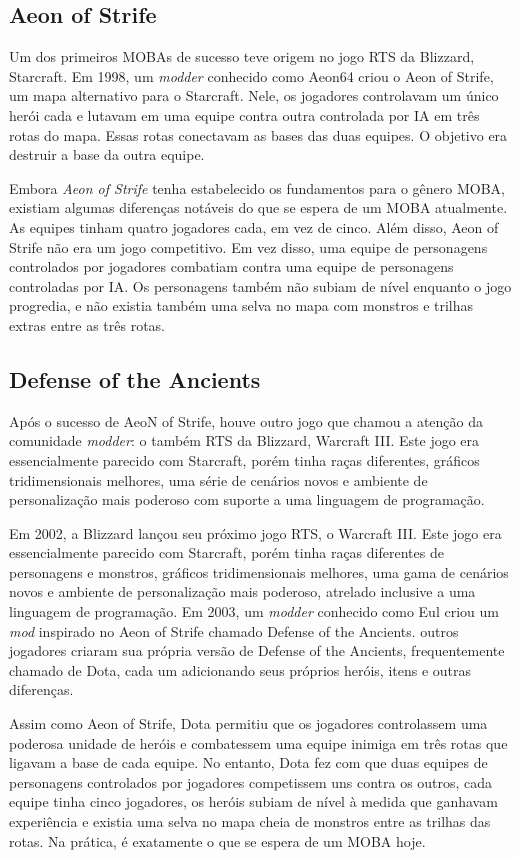 \subsection{Aeon of Strife}
Um dos primeiros MOBAs de sucesso teve origem no jogo RTS da Blizzard, Starcraft. Em 1998, um \textit{modder} conhecido como Aeon64 criou o Aeon of Strife, um mapa alternativo para o Starcraft. Nele, os jogadores controlavam um único herói cada e lutavam em uma equipe contra outra controlada por IA em três rotas do mapa. Essas rotas conectavam as bases das duas equipes. O objetivo era destruir a base da outra equipe.

Embora \textit{Aeon of Strife} tenha estabelecido os fundamentos para o gênero MOBA, existiam algumas diferenças notáveis do que se espera de um MOBA atualmente. As equipes tinham quatro jogadores cada, em vez de cinco. Além disso, Aeon of Strife não era um jogo competitivo. Em vez disso, uma equipe de personagens controlados por jogadores combatiam contra uma equipe de personagens controladas por IA. Os personagens também não subiam de nível enquanto o jogo progredia, e não existia também uma selva no mapa com monstros e trilhas extras entre as três rotas.

\subsection{Defense of the Ancients}
Após o sucesso de AeoN of Strife, houve outro jogo que chamou a atenção da comunidade \textit{modder}: o também RTS da Blizzard, Warcraft III. Este jogo era essencialmente parecido com Starcraft, porém tinha raças diferentes, gráficos tridimensionais melhores, uma série de cenários novos e ambiente de personalização mais poderoso com suporte a uma linguagem de programação.

Em 2002, a Blizzard lançou seu próximo jogo RTS, o Warcraft III. Este jogo era essencialmente parecido com Starcraft, porém tinha raças diferentes de personagens e monstros, gráficos tridimensionais melhores, uma gama de cenários novos e ambiente de personalização mais poderoso, atrelado inclusive a uma linguagem de programação. Em 2003, um \textit{modder} conhecido como Eul criou um \textit{mod} inspirado no Aeon of Strife chamado Defense of the Ancients.  outros jogadores criaram sua própria versão de Defense of the Ancients, frequentemente chamado de Dota, cada um adicionando seus próprios heróis, itens e outras diferenças.

Assim como Aeon of Strife, Dota permitiu que os jogadores controlassem uma poderosa unidade de heróis e combatessem uma equipe inimiga em três rotas que ligavam a base de cada equipe. No entanto, Dota fez com que duas equipes de personagens controlados por jogadores competissem uns contra os outros, cada equipe tinha cinco jogadores, os heróis subiam de nível à medida que ganhavam experiência e existia uma selva no mapa cheia de monstros entre as trilhas das rotas. Na prática, é exatamente o que se espera de um MOBA hoje.

